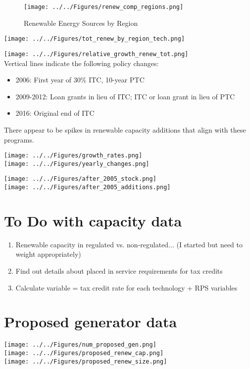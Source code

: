 \documentclass[11pt, oneside]{article}   	%
\begin{document}
\begin{figure}
\caption{Renewable Energy Sources by Region}
\texttt{[image: ../../Figures/renew\_comp\_regions.png]}
\end{figure}
\newpage
\texttt{[image: ../../Figures/tot\_renew\_by\_region\_tech.png]}

\newpage

\texttt{[image: ../../Figures/relative\_growth\_renew\_tot.png]}
\\

Vertical lines indicate the following policy changes:
\begin{itemize}
\item  2006:  First year of 30\% ITC, 10-year PTC
\item 2009-2012: Loan grants in lieu of ITC; ITC or loan grant in lieu of PTC
\item  2016: Original end of ITC  
 \end{itemize}
There appear to be spikes in renewable capacity additions that align with these programs. 

\texttt{[image: ../../Figures/growth\_rates.png]}\\
\texttt{[image: ../../Figures/yearly\_changes.png]}



\newpage
\texttt{[image: ../../Figures/after\_2005\_stock.png]}\\
\texttt{[image: ../../Figures/after\_2005\_additions.png]}

\newpage

\section{To Do with capacity data}
\begin{enumerate}
\item Renewable capacity in regulated vs. non-regulated... (I started but need to weight appropriately)
\item Find out details about placed in service requirements for tax credits
\item Calculate variable = tax credit rate for each technology + RPS variables
\end{enumerate}

\newpage
\section{Proposed generator data}

\texttt{[image: ../../Figures/num\_proposed\_gen.png]}\\
\texttt{[image: ../../Figures/proposed\_renew\_cap.png]}\\
\texttt{[image: ../../Figures/proposed\_renew\_size.png]}
\end{document}
